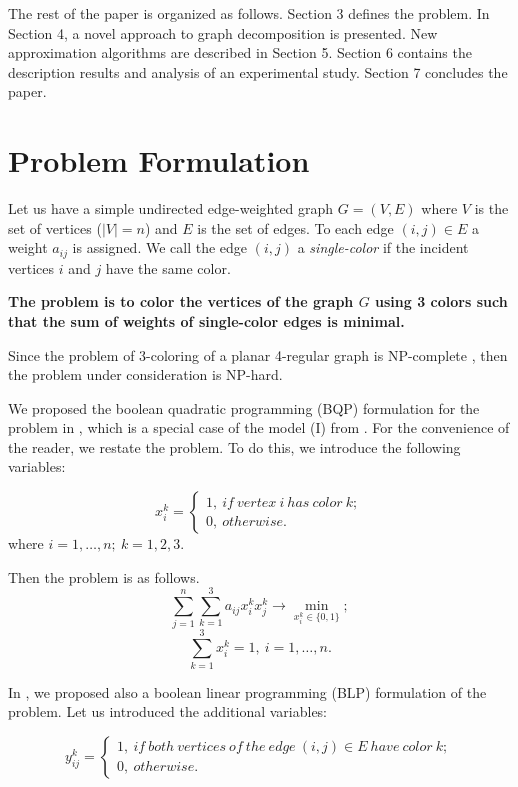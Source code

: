 \documentclass[runningheads]{llncs}
\begin{document}
The rest of the paper is organized as follows. Section 3 defines the problem. In Section 4, a novel approach to graph decomposition is presented. New approximation algorithms are described in Section 5. Section 6 contains the description results and analysis of an experimental study. Section 7 concludes the paper.

\section{Problem Formulation}
Let us have a simple undirected edge-weighted graph $G=(V,E)$ where $V$ is the set of vertices ($|V|=n$) and $E$ is the set of edges. To each edge $(i,j)\in E$ a weight $a_{ij}$ is assigned. We call the edge $(i,j)$ a \emph{single-color} if the incident vertices $i$ and $j$ have the same color.

\textbf{The problem is to color the vertices of the graph $G$ using 3 colors such that the sum of weights of single-color edges is minimal.}

Since the problem of 3-coloring of a planar 4-regular graph is NP-complete \cite{Dailey:80}, then the problem under consideration is NP-hard.

We proposed the boolean quadratic programming (BQP) formulation for the problem in \cite{Erzin:24}, which is a special case of the model (I) from \cite{Gui:18}. For the convenience of the reader, we restate the problem. To do this, we introduce the following variables:

$$
 x_{i}^{k} = \left\{
  \begin{array}{ll}
    1,\ if\ vertex\ i\ has\ color\ k;\\
    0,\ otherwise.
  \end{array}
\right.
$$
where $i=1,\ldots,n;\ k=1,2,3$.

Then the problem is as follows.
\begin{equation}\label{e1}
  \sum_{j=1}^n\sum_{k=1}^{3} a_{ij}x_{i}^{k}x_{j}^{k}\to\min_{x_{i}^{k}\in\{0,1\}};
\end{equation}
\begin{equation}\label{e2}
  \sum_{k=1}^{3} x_{i}^{k}=1, \ i=1,\ldots,n.
\end{equation}

In \cite{Erzin:24}, we proposed also a boolean linear programming (BLP) formulation of the problem. Let us introduced the additional variables:

$$
 y_{ij}^{k} = \left\{
  \begin{array}{ll}
    1,\ if\ both\ vertices\ of\ the\ edge\ (i,j)\in E\ have\ color\ k;\\
    0,\ otherwise.
  \end{array}
\right.
$$
\end{document}
